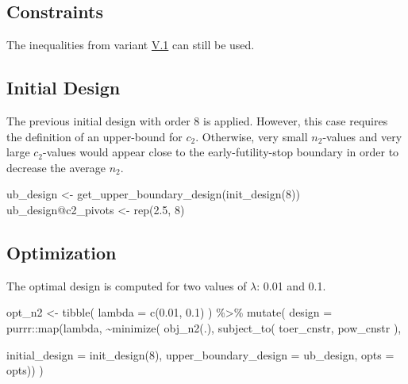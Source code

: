 \documentclass[
]{book}
\newenvironment{Shaded}{\begin{snugshade}}{\end{snugshade}}
\newcommand{\AttributeTok}[1]{\textcolor[rgb]{0.77,0.63,0.00}{#1}}
\newcommand{\DecValTok}[1]{\textcolor[rgb]{0.00,0.00,0.81}{#1}}
\newcommand{\FloatTok}[1]{\textcolor[rgb]{0.00,0.00,0.81}{#1}}
\newcommand{\FunctionTok}[1]{\textcolor[rgb]{0.00,0.00,0.00}{#1}}
\newcommand{\NormalTok}[1]{#1}
\newcommand{\OtherTok}[1]{\textcolor[rgb]{0.56,0.35,0.01}{#1}}
\newcommand{\SpecialCharTok}[1]{\textcolor[rgb]{0.00,0.00,0.00}{#1}}
\begin{document}
\hypertarget{constraints-13}{%
\subsection{Constraints}\label{constraints-13}}

The inequalities from variant \protect\hyperlink{variantV_1}{V.1} can still be used.

\hypertarget{initial-design-11}{%
\subsection{Initial Design}\label{initial-design-11}}

The previous initial design with order \(8\) is applied.
However, this case requires the definition of an upper-bound for \(c_2\).
Otherwise, very small \(n_2\)-values and very large \(c_2\)-values would
appear close to the early-futility-stop boundary in order to
decrease the average \(n_2\).

\begin{Shaded}
\begin{Highlighting}[]
\NormalTok{ub\_design }\OtherTok{\textless{}{-}} \FunctionTok{get\_upper\_boundary\_design}\NormalTok{(}\FunctionTok{init\_design}\NormalTok{(}\DecValTok{8}\NormalTok{))}
\NormalTok{ub\_design}\SpecialCharTok{@}\NormalTok{c2\_pivots }\OtherTok{\textless{}{-}} \FunctionTok{rep}\NormalTok{(}\FloatTok{2.5}\NormalTok{, }\DecValTok{8}\NormalTok{)}
\end{Highlighting}
\end{Shaded}

\hypertarget{optimization-12}{%
\subsection{Optimization}\label{optimization-12}}

The optimal design is computed for two values of \(\lambda\): 0.01 and 0.1.

\begin{Shaded}
\begin{Highlighting}[]
\NormalTok{opt\_n2 }\OtherTok{\textless{}{-}} \FunctionTok{tibble}\NormalTok{(}
  \AttributeTok{lambda =} \FunctionTok{c}\NormalTok{(}\FloatTok{0.01}\NormalTok{, }\FloatTok{0.1}\NormalTok{)}
\NormalTok{) }\SpecialCharTok{\%\textgreater{}\%}
  \FunctionTok{mutate}\NormalTok{(}
    \AttributeTok{design =}\NormalTok{ purrr}\SpecialCharTok{::}\FunctionTok{map}\NormalTok{(lambda, }\SpecialCharTok{\textasciitilde{}}\FunctionTok{minimize}\NormalTok{(}
          \FunctionTok{obj\_n2}\NormalTok{(.),}
          \FunctionTok{subject\_to}\NormalTok{(}
\NormalTok{              toer\_cnstr,}
\NormalTok{              pow\_cnstr}
\NormalTok{          ),}
          
          \AttributeTok{initial\_design =} \FunctionTok{init\_design}\NormalTok{(}\DecValTok{8}\NormalTok{), }
          \AttributeTok{upper\_boundary\_design =}\NormalTok{ ub\_design,}
          \AttributeTok{opts           =}\NormalTok{ opts)) }
\NormalTok{)}
\end{Highlighting}
\end{Shaded}
\end{document}
